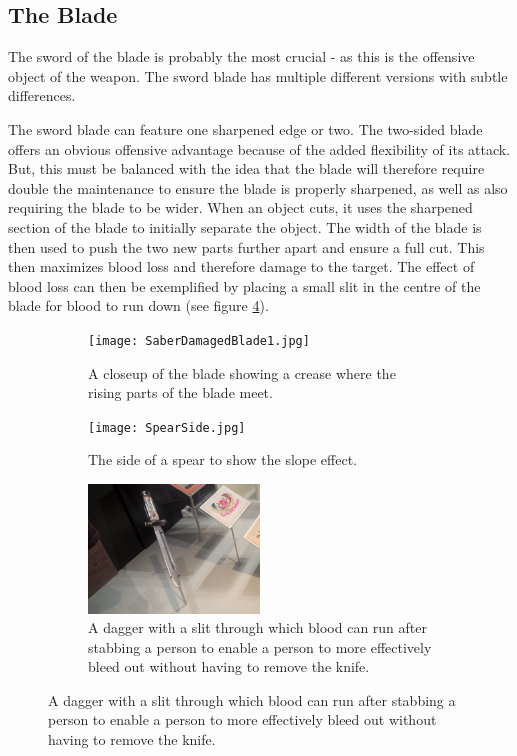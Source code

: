 \documentclass{article}
\begin{document}
\subsection{The Blade}

The sword of the blade is probably the most crucial - as this is the offensive object of the weapon. The sword blade has multiple different versions with subtle differences.

The sword blade can feature one sharpened edge or two. The two-sided blade offers an obvious offensive advantage because of the added flexibility of its attack. But, this must be balanced with the idea that the blade will therefore require double the maintenance to ensure the blade is properly sharpened, as well as also requiring the blade to be wider. When an object cuts, it uses the sharpened section of the blade to initially separate the object. The width of the blade is then used to push the two new parts further apart and ensure a full cut. This then maximizes blood loss and therefore damage to the target. The effect of blood loss can then be exemplified by placing a small slit in the centre of the blade for blood to run down (see figure \ref{fig:swordSlit}). 

\begin{figure}[h]
    \centering
    \caption{}
    \begin{subfigure}{0.49\textwidth}
        \texttt{[image: SaberDamagedBlade1.jpg]}
        \caption{A closeup of the blade showing a crease where the rising parts of the blade meet.}
        \label{fig:SwordCrease}
    \end{subfigure}
    \begin{subfigure}{0.49\textwidth}
        \texttt{[image: SpearSide.jpg]}
        \caption{The side of a spear to show the slope effect.}
        \label{fig:SpearSide}
    \end{subfigure}
    \begin{subfigure}{\textwidth}
        \centering
        \includegraphics[width=0.5\textwidth]{Dagger2.jpg}
        \caption{A dagger with a slit through which blood can run after stabbing a person to enable a person to more effectively bleed out without having to remove the knife.}
        \label{fig:swordSlit}
    \end{subfigure}
\end{figure}
\end{document}

